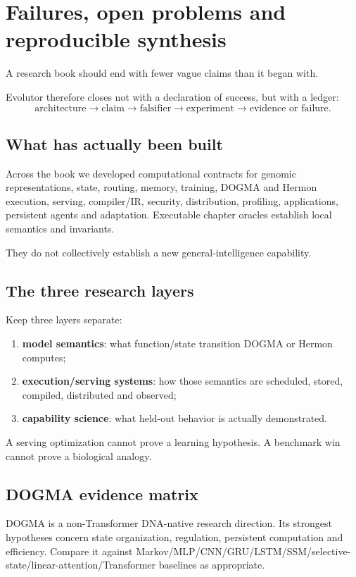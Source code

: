 \chapter{Failures, open problems and reproducible synthesis}

A research book should end with fewer vague claims than it began with.

Evolutor therefore closes not with a declaration of success, but with a ledger:
\[
\boxed{\text{architecture}\rightarrow\text{claim}\rightarrow
\text{falsifier}\rightarrow\text{experiment}\rightarrow
\text{evidence or failure}.}
\]

\section{What has actually been built}
Across the book we developed computational contracts for genomic representations, state, routing, memory, training, DOGMA and Hermon execution, serving, compiler/IR, security, distribution, profiling, applications, persistent agents and adaptation. Executable chapter oracles establish local semantics and invariants.

They do not collectively establish a new general-intelligence capability.

\section{The three research layers}
Keep three layers separate:
\begin{enumerate}
\item \textbf{model semantics}: what function/state transition DOGMA or Hermon computes;
\item \textbf{execution/serving systems}: how those semantics are scheduled, stored, compiled, distributed and observed;
\item \textbf{capability science}: what held-out behavior is actually demonstrated.
\end{enumerate}
A serving optimization cannot prove a learning hypothesis. A benchmark win cannot prove a biological analogy.

\section{DOGMA evidence matrix}
DOGMA is a non-Transformer DNA-native research direction. Its strongest hypotheses concern state organization, regulation, persistent computation and efficiency. Compare it against Markov/MLP/CNN/GRU/LSTM/SSM/selective-state/linear-attention/Transformer baselines as appropriate.


